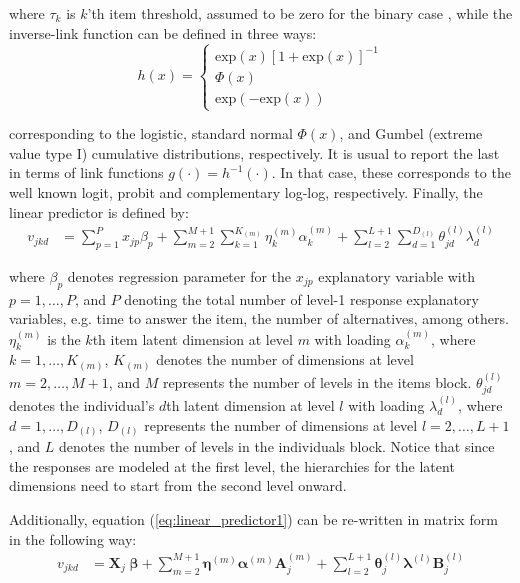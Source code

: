 \noindent where $\tau_{k}$ is $k$'th item threshold, assumed to be zero for the binary case \cite{Rabe_et_al_2004a}, while the inverse-link function can be defined in three ways:
%
\begin{equation} \label{eq:response_dich1}
	h(x) = 
	\begin{cases}
		\text{exp}(x)[1 + \text{exp}(x)]^{-1} \\
		\Phi(x)  \\
		\text{exp}(-\text{exp}(x))
	\end{cases}
\end{equation}

\noindent corresponding to the logistic, standard normal $\Phi(x)$, and Gumbel (extreme value type I) cumulative distributions, respectively. It is usual to report the last in terms of link functions $g(\cdot) = h^{-1}(\cdot)$. In that case, these corresponds to the well known logit, probit and complementary log-log, respectively. Finally, the linear predictor is defined by:
%
\begin{equation} \label{eq:linear_predictor1}
	\begin{split}
		v_{jkd} &= \sum_{p=1}^{P} x_{jp} \beta_{p} + \sum_{m=2}^{M+1} \sum_{k=1}^{K_{(m)}} \eta_{k}^{(m)} \alpha_{k}^{(m)} + \sum_{l=2}^{L+1} \sum_{d=1}^{D_{(l)}} \theta_{jd}^{(l)} \lambda_{d}^{(l)}
	\end{split}
\end{equation}

\noindent where $\beta_{p}$ denotes regression parameter for the $x_{jp}$ explanatory variable with $p=1,\dots, P$, and $P$ denoting the total number of level-1 response explanatory variables, e.g. time to answer the item, the number of alternatives, among others. $\eta_{k}^{(m)}$ is the $k$th item latent dimension at level $m$ with loading $\alpha_{k}^{(m)}$, where $k= 1, \dots, K_{(m)}$, $K_{(m)}$ denotes the number of dimensions at level $m=2,\dots, M+1$, and $M$ represents the number of levels in the items block. $\theta_{jd}^{(l)}$ denotes the individual's $d$th latent dimension at level $l$ with loading $\lambda_{d}^{(l)}$, where $d=1, \dots, D_{(l)}$, $D_{(l)}$ represents the number of dimensions at level $l=2, \dots, L+1$, and $L$ denotes the number of levels in the individuals block. Notice that since the responses are modeled at the first level, the hierarchies for the latent dimensions need to start from the second level onward.

Additionally, equation (\ref{eq:linear_predictor1}) can be re-written in matrix form in the following way:
%
\begin{equation} \label{eq:linear_predictor2}
	\begin{split}
		v_{jkd} &= \mathbf{X}_{j} \; \pmb{\beta} + \sum_{m=2}^{M+1} \pmb{\eta}^{(m)} \pmb{\alpha}^{(m)} \mathbf{A}_{j}^{(m)} + \sum_{l=2}^{L+1} \pmb{\theta}_{j}^{(l)} \pmb{\lambda}^{(l)} \mathbf{B}_{j}^{(l)}
	\end{split}
\end{equation}

